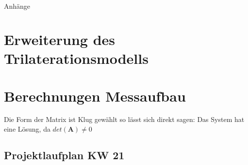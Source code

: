%
%
%
%

\begin{appendix}
\newpage
\begin{center}
	\huge{Anhänge}
\end{center}

\normalsize

\section{Erweiterung des Trilaterationsmodells}
\label{sec:extended_trilateration_model}


\newpage
	\section{Berechnungen Messaufbau}
%
Die Form der Matrix ist Klug gewählt so lässt sich direkt sagen: Das System hat eine Lösung, da $det(\mathbf{A})\neq 0$
	
	\label{sec:coordinate_Measurements}
%
\newpage
\begin{landscape}
	\section{Projektlaufplan KW 21}
	\label{sec:projectplan}
	\scalebox{.75}{
		
		}
\end{landscape}


\end{appendix}
